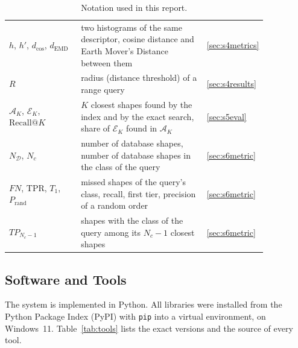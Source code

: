 \documentclass[10pt,a4paper]{article}
\begin{document}
\begin{table}[htbp]
\begin{tabular}{@{}p{0.30\linewidth}p{0.55\linewidth}l@{}}
$h$, $h'$, $d_{\cos}$, $d_{\mathrm{EMD}}$ & two histograms of the same descriptor, cosine distance and Earth Mover's Distance between them & \ref{sec:s4metrics}\\
$R$ & radius (distance threshold) of a range query & \ref{sec:s4results}\\
$\mathcal{A}_K$, $\mathcal{E}_K$, $\mathrm{Recall}@K$ & $K$ closest shapes found by the index and by the exact search, share of $\mathcal{E}_K$ found in $\mathcal{A}_K$ & \ref{sec:s5eval}\\
$N_{\mathcal{D}}$, $N_c$ & number of database shapes, number of database shapes in the class of the query & \ref{sec:s6metric}\\
$FN$, TPR, $T_1$, $P_{\mathrm{rand}}$ & missed shapes of the query's class, recall, first tier, precision of a random order & \ref{sec:s6metric}\\
$TP_{N_c-1}$ & shapes with the class of the query among its $N_c-1$ closest shapes & \ref{sec:s6metric}\\
\bottomrule\end{tabular}
\caption{Notation used in this report.}\label{tab:notation}
\end{table}

\subsection{Software and Tools}\label{sec:tools}
The system is implemented in Python. All libraries were installed from the Python Package Index (PyPI) with \texttt{pip} into a
virtual environment, on Windows~11. Table~\ref{tab:tools} lists the exact versions and the source of every tool.
\end{document}
